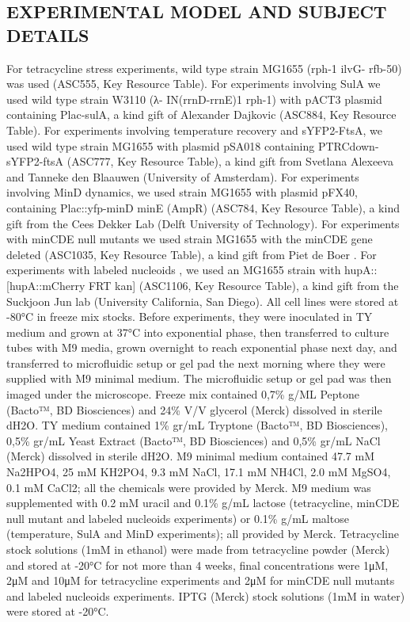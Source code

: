 \subsection{EXPERIMENTAL MODEL AND SUBJECT DETAILS}
For tetracycline stress experiments, wild type strain MG1655 (rph-1 ilvG- rfb-50) was used (ASC555, Key Resource Table). For experiments involving SulA we used wild type strain W3110 (λ- IN(rrnD-rrnE)1 rph-1) with pACT3 plasmid containing Plac-sulA, a kind gift of Alexander Dajkovic \cite{Dajkovic2008} (ASC884, Key Resource Table). For experiments involving temperature recovery and sYFP2-FtsA, we used wild type strain MG1655  with plasmid pSA018 containing PTRCdown-sYFP2-ftsA (ASC777, Key Resource Table), a kind gift from Svetlana Alexeeva and Tanneke den Blaauwen (University of Amsterdam). For experiments involving MinD dynamics, we used strain MG1655 with plasmid pFX40, containing Plac::yfp-minD minE (AmpR) (ASC784, Key Resource Table), a kind gift from the Cees Dekker Lab (Delft University of Technology). For experiments with minCDE null mutants we used strain MG1655 with the minCDE gene deleted  (ASC1035, Key Resource Table), a kind gift from Piet de Boer \cite{DeBoer1989}. For experiments with labeled nucleoids \cite{Wery2001}, we used an MG1655 strain with  hupA::[hupA::mCherry FRT kan] (ASC1106, Key Resource Table), a kind gift from the Suckjoon Jun lab (University California, San Diego).
All cell lines were stored at -80°C in freeze mix stocks. Before experiments, they were inoculated in TY medium and grown at 37°C into exponential phase, then transferred to culture tubes with M9 media, grown overnight to reach exponential phase next day, and transferred to microfluidic setup or gel pad the next morning where they were supplied with M9 minimal medium. The microfluidic setup or gel pad was then imaged under the microscope. Freeze mix contained 0,7\% g/ML Peptone (Bacto™, BD Biosciences) and 24\% V/V glycerol (Merck) dissolved in sterile dH2O. TY medium contained 1\% gr/mL Tryptone (Bacto™, BD Biosciences), 0,5\% gr/mL Yeast Extract (Bacto™, BD Biosciences) and 0,5\% gr/mL NaCl (Merck) dissolved in sterile dH2O. M9 minimal medium contained 47.7 mM Na2HPO4, 25 mM KH2PO4, 9.3 mM NaCl, 17.1 mM NH4Cl, 2.0 mM MgSO4, 0.1 mM CaCl2; all the chemicals were provided by Merck. M9 medium was supplemented with 0.2 mM uracil and 0.1\% g/mL lactose (tetracycline, minCDE null mutant and labeled nucleoids experiments) or 0.1\% g/mL maltose (temperature, SulA and MinD experiments); all provided by Merck. Tetracycline stock solutions (1mM in ethanol) were made from tetracycline powder (Merck) and stored at -20°C for not more than 4 weeks, final concentrations were 1μM, 2μM and 10μM for tetracycline experiments and 2μM for minCDE null mutants and labeled nucleoids experiments. IPTG (Merck) stock solutions (1mM in water) were stored at -20°C.

